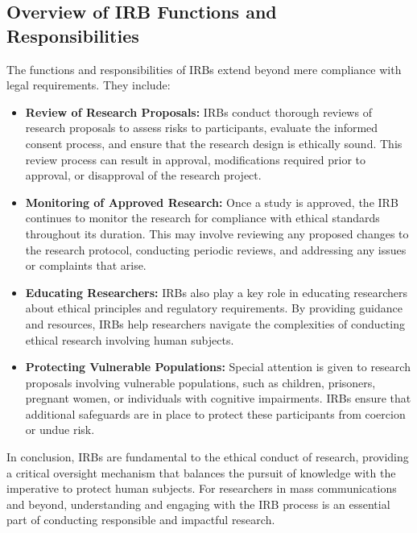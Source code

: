 \documentclass[
]{book}
\begin{document}
\hypertarget{overview-of-irb-functions-and-responsibilities}{%
\subsection*{Overview of IRB Functions and Responsibilities}\label{overview-of-irb-functions-and-responsibilities}}

The functions and responsibilities of IRBs extend beyond mere compliance with legal requirements. They include:

\begin{itemize}
\item
  \textbf{Review of Research Proposals:} IRBs conduct thorough reviews of research proposals to assess risks to participants, evaluate the informed consent process, and ensure that the research design is ethically sound. This review process can result in approval, modifications required prior to approval, or disapproval of the research project.
\item
  \textbf{Monitoring of Approved Research:} Once a study is approved, the IRB continues to monitor the research for compliance with ethical standards throughout its duration. This may involve reviewing any proposed changes to the research protocol, conducting periodic reviews, and addressing any issues or complaints that arise.
\item
  \textbf{Educating Researchers:} IRBs also play a key role in educating researchers about ethical principles and regulatory requirements. By providing guidance and resources, IRBs help researchers navigate the complexities of conducting ethical research involving human subjects.
\item
  \textbf{Protecting Vulnerable Populations:} Special attention is given to research proposals involving vulnerable populations, such as children, prisoners, pregnant women, or individuals with cognitive impairments. IRBs ensure that additional safeguards are in place to protect these participants from coercion or undue risk.
\end{itemize}

In conclusion, IRBs are fundamental to the ethical conduct of research, providing a critical oversight mechanism that balances the pursuit of knowledge with the imperative to protect human subjects. For researchers in mass communications and beyond, understanding and engaging with the IRB process is an essential part of conducting responsible and impactful research.
\end{document}
